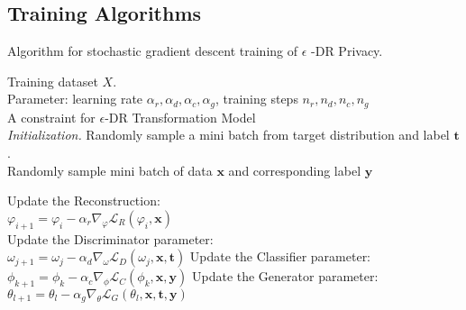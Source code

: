 \subsection{Training Algorithms}


\begin{algorithm}[h]
	\caption{Algorithm for stochastic gradient descent training of $\epsilon$ -DR Privacy.}
	\begin{algorithmic}[1]
		\renewcommand{\algorithmicrequire}{\textbf{Input:}}
		\renewcommand{\algorithmicensure}{\textbf{Output:}}
		\REQUIRE Training dataset $X$. \\Parameter: learning rate $\alpha_r,\alpha_d,\alpha_c,\alpha_g $, 
		training steps $n_r,n_d,n_c,n_g$ \\
		A constraint for $\epsilon$-DR 
		\ENSURE  Transformation Model
		\\ \textit{Initialization.} 
		\STATE  Randomly sample a mini batch from target distribution and label $\boldsymbol{t}$.\\
		\STATE  Randomly sample mini batch of data $\boldsymbol x $ and corresponding label $\boldsymbol{y}$  
		
		\STATE	Update the Reconstruction:\\
		$ \varphi_{i+1} = \varphi_{i} - \alpha_r \nabla_\varphi{\mathcal{L}_R(\varphi_{i} ,\boldsymbol{x} ) }	$\\
		\ENDFOR	
		\STATE	Update the Discriminator parameter:\\
		$ \omega_{j+1} = \omega_{j} - \alpha_d \nabla_\omega{\mathcal{L}_D(\omega_{j} ,\boldsymbol{x,t} ) }	$
		\ENDFOR	
		\STATE	Update the Classifier parameter:\\
		$ \phi_{k+1} = \phi_{k} - \alpha_c \nabla_\phi{\mathcal{L}_C(\phi_{k} ,\boldsymbol{x,y} ) }	$
		\ENDFOR	
		\STATE	Update the Generator parameter:\\
		$\theta_{l+1} = \theta_{l} - \alpha_g \nabla_\theta{\mathcal{L}_G(\theta_{l} ,\boldsymbol{x,t,y} ) }$
		\ENDFOR					
		\ENDFOR
		
		\RETURN 
	\end{algorithmic}
	\label{alg}
\end{algorithm}



